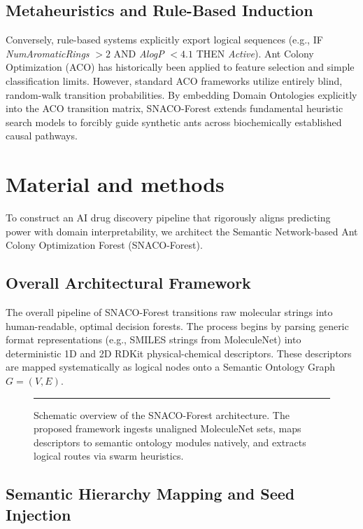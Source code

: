 \documentclass[preprint,12pt,authoryear]{elsarticle}
\begin{document}
\subsection{Metaheuristics and Rule-Based Induction}
Conversely, rule-based systems explicitly export logical sequences (e.g., IF \textit{NumAromaticRings} $> 2$ AND \textit{AlogP} $< 4.1$ THEN \textit{Active}). Ant Colony Optimization (ACO) has historically been applied to feature selection and simple classification limits. However, standard ACO frameworks utilize entirely blind, random-walk transition probabilities. By embedding Domain Ontologies explicitly into the ACO transition matrix, SNACO-Forest extends fundamental heuristic search models to forcibly guide synthetic ants across biochemically established causal pathways.

\section{Material and methods}
\label{sec:methods}

To construct an AI drug discovery pipeline that rigorously aligns predicting power with domain interpretability, we architect the Semantic Network-based Ant Colony Optimization Forest (SNACO-Forest). 

\subsection{Overall Architectural Framework}
\label{subsec:overall_arch}

The overall pipeline of SNACO-Forest transitions raw molecular strings into human-readable, optimal decision forests. The process begins by parsing generic format representations (e.g., SMILES strings from MoleculeNet) into deterministic 1D and 2D RDKit physical-chemical descriptors. These descriptors are mapped systematically as logical nodes onto a Semantic Ontology Graph $G = (V, E)$. 

\begin{figure}[htpb!]
    \centering
    \rule{12cm}{6cm} %
    \vspace{0.2cm}
    \caption{Schematic overview of the SNACO-Forest architecture. The proposed framework ingests unaligned MoleculeNet sets, maps descriptors to semantic ontology modules natively, and extracts logical routes via swarm heuristics.}
    \label{fig:framework}
\end{figure}

\subsection{Semantic Hierarchy Mapping and Seed Injection}
\label{subsec:hierarchy}
\end{document}
